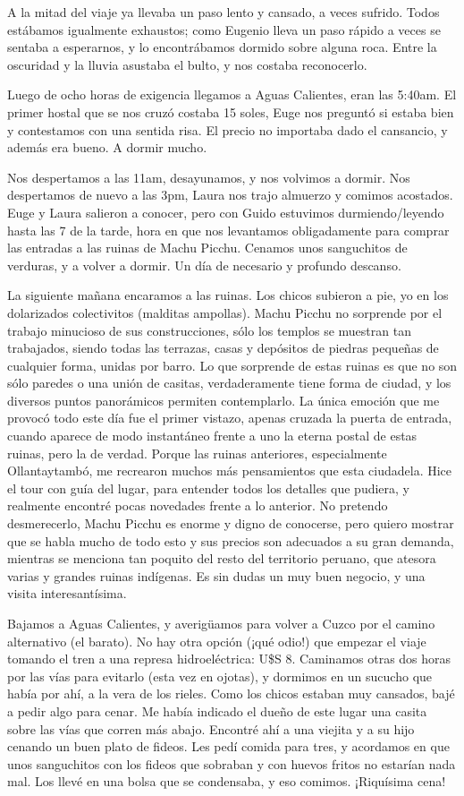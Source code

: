 A la mitad del viaje ya llevaba un paso lento y cansado, a veces sufrido. Todos
estábamos igualmente exhaustos; como Eugenio lleva un paso rápido a veces se
sentaba a esperarnos, y lo encontrábamos dormido sobre alguna roca. Entre la
oscuridad y la lluvia asustaba el bulto, y nos costaba reconocerlo.

Luego de ocho horas de exigencia llegamos a Aguas Calientes, eran las 5:40am. El
primer hostal que se nos cruzó costaba 15 soles, Euge nos preguntó si estaba
bien y contestamos con una sentida risa. El precio no importaba dado el
cansancio, y además era bueno. A dormir mucho.

Nos despertamos a las 11am, desayunamos, y nos volvimos a dormir. Nos
despertamos de nuevo a las 3pm, Laura nos trajo almuerzo y comimos acostados.
Euge y Laura salieron a conocer, pero con Guido estuvimos durmiendo/leyendo
hasta las 7 de la tarde, hora en que nos levantamos obligadamente para comprar
las entradas a las ruinas de Machu Picchu. Cenamos unos sanguchitos de verduras,
y a volver a dormir. Un día de necesario y profundo descanso.

La siguiente mañana encaramos a las ruinas. Los chicos subieron a pie, yo en
los dolarizados colectivitos (malditas ampollas). Machu Picchu no sorprende por
el trabajo minucioso de sus construcciones, sólo los templos se muestran tan
trabajados, siendo todas las terrazas, casas y depósitos de piedras pequeñas
de cualquier forma, unidas por barro. Lo que sorprende de estas ruinas es que no
son sólo paredes o una unión de casitas, verdaderamente tiene forma de ciudad,
y los diversos puntos panorámicos permiten contemplarlo. La única emoción que
me provocó todo este día fue el primer vistazo, apenas cruzada la puerta de
entrada, cuando aparece de modo instantáneo frente a uno la eterna postal de
estas ruinas, pero la de verdad. Porque las ruinas anteriores, especialmente
Ollantaytambó, me recrearon muchos más pensamientos que esta ciudadela. Hice
el tour con guía del lugar, para entender todos los detalles que pudiera, y
realmente encontré pocas novedades frente a lo anterior. No pretendo
desmerecerlo, Machu Picchu es enorme y digno de conocerse, pero quiero mostrar
que se habla mucho de todo esto y sus precios son adecuados a su gran demanda,
mientras se menciona tan poquito del resto del territorio peruano, que atesora
varias y grandes ruinas indígenas. Es sin dudas un muy buen negocio, y una
visita interesantísima.

Bajamos a Aguas Calientes, y averig\"uamos para volver a Cuzco por el camino
alternativo (el barato). No hay otra opción (¡qué odio!) que
empezar el viaje tomando el tren a una represa hidroeléctrica: U\$S 8.
Caminamos otras dos horas por las vías para evitarlo (esta vez en ojotas), y
dormimos en un sucucho que había por ahí, a la vera de los rieles. Como los
chicos estaban muy cansados, bajé a pedir algo para cenar. Me había indicado
el dueño de este lugar una casita sobre las vías que corren más abajo.
Encontré ahí a una viejita y a su hijo cenando un buen plato de fideos. Les
pedí comida para tres, y acordamos en que unos sanguchitos con los fideos que
sobraban y con huevos fritos no estarían nada mal. Los llevé en una bolsa que
se condensaba, y eso comimos. ¡Riquísima cena!\\

